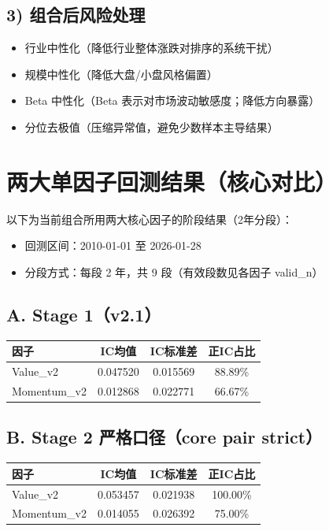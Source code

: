 \documentclass[12pt,a4paper,fontset=fandol]{ctexart}
\begin{document}
\subsection*{3) 组合后风险处理}
\begin{itemize}
  \item 行业中性化（降低行业整体涨跌对排序的系统干扰）
  \item 规模中性化（降低大盘/小盘风格偏置）
  \item Beta 中性化（Beta 表示对市场波动敏感度；降低方向暴露）
  \item 分位去极值（压缩异常值，避免少数样本主导结果）
\end{itemize}

\section{两大单因子回测结果（核心对比）}
以下为当前组合所用两大核心因子的阶段结果（2年分段）：
\begin{itemize}
  \item 回测区间：2010-01-01 至 2026-01-28
  \item 分段方式：每段 2 年，共 9 段（有效段数见各因子 valid\_n）
\end{itemize}

\subsection*{A. Stage 1（v2.1）}
\begin{center}
\begin{tabular}{lccc}
\toprule
因子 & IC均值 & IC标准差 & 正IC占比 \\
\midrule
Value\_v2 & 0.047520 & 0.015569 & 88.89\% \\
Momentum\_v2 & 0.012868 & 0.022771 & 66.67\% \\
\bottomrule
\end{tabular}
\end{center}

\subsection*{B. Stage 2 严格口径（core pair strict）}
\begin{center}
\begin{tabular}{lccc}
\toprule
因子 & IC均值 & IC标准差 & 正IC占比 \\
\midrule
Value\_v2 & 0.053457 & 0.021938 & 100.00\% \\
Momentum\_v2 & 0.014055 & 0.026392 & 75.00\% \\
\bottomrule
\end{tabular}
\end{center}
\end{document}
